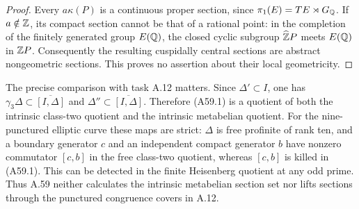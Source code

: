 \begin{proof}
Every $a\kappa(P)$ is a continuous proper section, since
$\pi_1(E)=T E\rtimes G_\mathbb Q$. If $a\notin\mathbb Z$, its compact section
cannot be that of a rational point: in the completion of the
finitely generated group $E(\mathbb Q)$, the closed cyclic subgroup
$\widehat{\mathbb Z} P$ meets $E(\mathbb Q)$ in $\mathbb Z P$. Consequently the resulting
cuspidally central sections are abstract nongeometric sections.
This proves no assertion about their local geometricity.
\end{proof}

The precise comparison with task A.12 matters. Since $\Delta'\subset
I$, one has $\gamma_3\Delta\subset\overline{[I,\Delta]}$ and
$\Delta''\subset\overline{[I,\Delta]}$. Therefore (A59.1) is a
quotient of both the intrinsic class-two quotient and the intrinsic
metabelian quotient. For the nine-punctured elliptic curve these
maps are strict: $\Delta$ is free profinite of rank ten, and a
boundary generator $c$ and an independent compact generator $b$
have nonzero commutator $[c,b]$ in the free class-two quotient,
whereas $[c,b]$ is killed in (A59.1). This can be detected in the
finite Heisenberg quotient at any odd prime. Thus A.59 neither
calculates the intrinsic metabelian section set nor lifts sections
through the punctured congruence covers in A.12.


